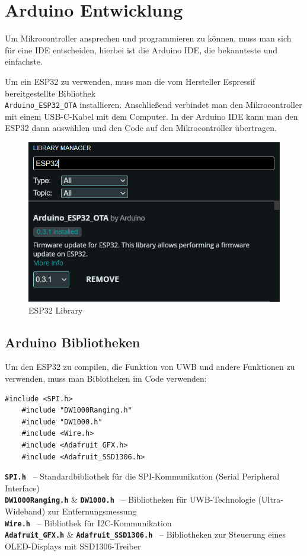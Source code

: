 \newpage
\section{Arduino Entwicklung}
Um Mikrocontroller ansprechen und programmieren zu können, muss man sich für eine IDE entscheiden, hierbei ist die Arduino IDE, \textcite{Arduino}
die bekannteste und einfachste.

Um ein ESP32 zu verwenden, muss man die vom Hersteller Espressif bereitgestellte Bibliothek \\ \texttt{Arduino\_ESP32\_OTA} installieren. Anschließend verbindet man den Mikrocontroller mit einem USB-C-Kabel mit dem Computer. In der Arduino IDE kann man den ESP32 dann auswählen und den Code auf den Mikrocontroller übertragen.

\begin{figure}[H]
	\centering
	\includegraphics[width=0.9\linewidth]{images/ArduinoLib.png}
	\caption[ESP32Library]{ESP32 Library}
	\label{fig:ESP32Lib}
\end{figure}

\newpage
\subsection{Arduino Bibliotheken}
Um den ESP32 zu compilen, die Funktion von UWB und andere Funktionen zu verwenden, muss man Biblotheken im Code verwenden: 
\begin{lstlisting}[style=C++, caption=Bibliotheken, captionpos=b]
	#include <SPI.h>
	#include "DW1000Ranging.h"
	#include "DW1000.h"
	#include <Wire.h>
	#include <Adafruit_GFX.h>
	#include <Adafruit_SSD1306.h>
\end{lstlisting}

\textbf{\texttt{SPI.h}} \ – Standardbibliothek für die SPI-Kommunikation (Serial Peripheral Interface) \\
\textbf{\texttt{DW1000Ranging.h}} \& \textbf{\texttt{DW1000.h}} \ – Bibliotheken für UWB-Technologie (Ultra-Wideband) zur Entfernungsmessung \\
\textbf{\texttt{Wire.h}} \ – Bibliothek für I2C-Kommunikation \\
\textbf{\texttt{Adafruit\_GFX.h}} \& \textbf{\texttt{Adafruit\_SSD1306.h}} \ – Bibliotheken zur Steuerung eines OLED-Displays mit SSD1306-Treiber


